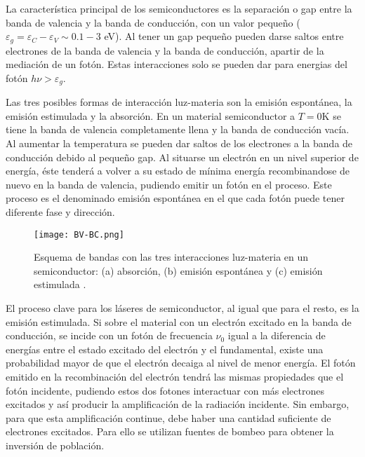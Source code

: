 \graphicspath{{./Introduccion/Figures/}}

La caracter\'istica principal de los semiconductores es la separaci\'on o gap entre la banda de valencia y la banda de conducci\'on, con un valor pequeño ($\varepsilon_g  = \varepsilon_C - \varepsilon_V \sim 0.1 - 3$ eV). Al tener un gap pequeño pueden darse saltos entre electrones de la banda de valencia y la banda de conducci\'on, apartir de la mediaci\'on de un fot\'on. Estas interacciones solo se pueden dar para energias del fot\'on $h\nu > \varepsilon_g$.

Las tres posibles formas de interacci\'on luz-materia son la emisi\'on espont\'anea, la emisi\'on estimulada y la absorci\'on. En un material semiconductor a $T = 0$K se tiene la banda de valencia completamente llena y la banda de conducci\'on vac\'ia. Al aumentar la temperatura se pueden dar saltos de los electrones a la banda de conducci\'on debido al pequeño gap. Al situarse un electr\'on en un nivel superior de energ\'ia, \'este tender\'a a volver a su estado de m\'inima energ\'ia recombinandose de nuevo en la banda de valencia, pudiendo emitir un fot\'on en el proceso. Este proceso es el denominado emisi\'on espont\'anea en el que cada fot\'on puede tener diferente fase y direcci\'on.

	\begin{figure}[H]
		\centering
		\texttt{[image: BV-BC.png]}
		\caption{\label{Img:Saleh-BV-BC}Esquema de bandas con las tres interacciones luz-materia en un semiconductor: (a) absorci\'on, (b) emisi\'on espont\'anea y (c) emisi\'on estimulada \cite{saleh2019fundamentals}.}
	\end{figure}

El proceso clave para los l\'aseres de semiconductor, al igual que para el resto, es la emisi\'on estimulada. Si sobre el material con un electr\'on excitado en la banda de conducci\'on, se incide con un fot\'on de frecuencia $\nu_0$ igual a la diferencia de energ\'ias entre el estado excitado del electr\'on y el fundamental, existe una probabilidad mayor de que el electr\'on decaiga al nivel de menor energ\'ia. El fot\'on emitido en la recombinaci\'on del electr\'on tendr\'a las mismas propiedades que el fot\'on incidente, pudiendo estos dos fotones interactuar con m\'as electrones excitados y as\'i producir la amplificaci\'on de la radiaci\'on incidente. Sin embargo, para que esta amplificaci\'on continue, debe haber una cantidad suficiente de electrones excitados. Para ello se utilizan fuentes de bombeo para obtener la inversi\'on de poblaci\'on.


